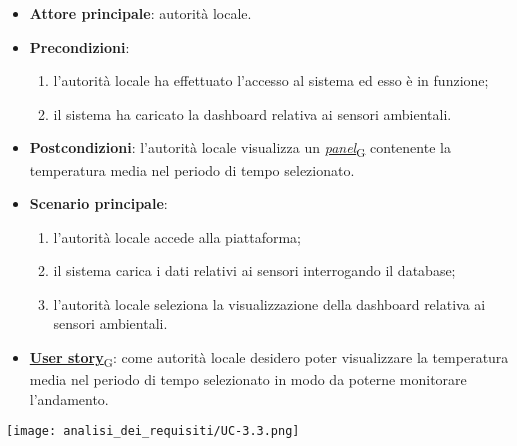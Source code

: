 \begin{itemize}
	\item \textbf{Attore principale}: autorità locale.
	\item \textbf{Precondizioni}:
	      \begin{enumerate}
		      \item l'autorità locale ha effettuato l'accesso al sistema ed esso è in funzione;
		      \item il sistema ha caricato la dashboard relativa ai sensori ambientali.
	      \end{enumerate}
	\item \textbf{Postcondizioni}: l'autorità locale visualizza un \href{https://7last.github.io/docs/rtb/documentazione-interna/glossario\#panel}{\textit{panel}\textsubscript{G}} contenente la temperatura media nel periodo di tempo selezionato.
	\item \textbf{Scenario principale}:
	      \begin{enumerate}
		      \item l'autorità locale accede alla piattaforma;
		      \item il sistema carica i dati relativi ai sensori interrogando il database;
		      \item l'autorità locale seleziona la visualizzazione della dashboard relativa ai sensori ambientali.
	      \end{enumerate}
	\item \href{https://7last.github.io/docs/rtb/documentazione-interna/glossario\#user-story}{\textbf{User story}\textsubscript{G}}: come autorità locale desidero poter visualizzare la temperatura media nel periodo di tempo selezionato
	      in modo da poterne monitorare l'andamento.
\end{itemize}
\begin{center}
	\texttt{[image: analisi\_dei\_requisiti/UC-3.3.png]}
\end{center}


